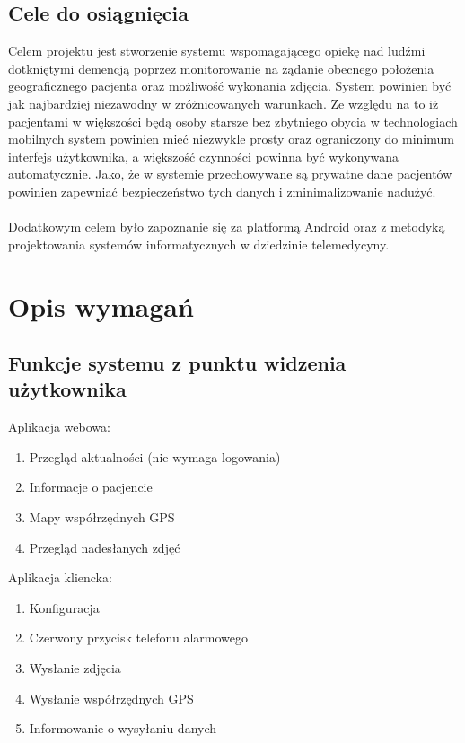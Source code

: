 \documentclass[11pt,a4paper]{article}
\begin{document}
\subsection {Cele do osiągnięcia}
Celem projektu jest stworzenie systemu wspomagającego opiekę nad ludźmi dotkniętymi demencją poprzez monitorowanie na żądanie obecnego położenia geograficznego pacjenta oraz możliwość wykonania zdjęcia. System powinien być jak najbardziej niezawodny w zróżnicowanych warunkach. Ze względu na to iż pacjentami w większości będą osoby starsze bez zbytniego obycia w technologiach mobilnych system powinien mieć niezwykle prosty oraz ograniczony do minimum interfejs użytkownika, a większość czynności powinna być wykonywana automatycznie. Jako, że w systemie przechowywane są prywatne dane pacjentów powinien zapewniać bezpieczeństwo tych danych i zminimalizowanie nadużyć.\\
\\
Dodatkowym celem było zapoznanie się za platformą Android oraz z metodyką projektowania systemów informatycznych w dziedzinie telemedycyny.
\section {Opis wymagań}
\subsection {Funkcje systemu z punktu widzenia użytkownika}
Aplikacja webowa:
\begin{enumerate}
  \item Przegląd aktualności (nie wymaga logowania)
  \item Informacje o pacjencie
  \item Mapy współrzędnych GPS
  \item Przegląd nadesłanych zdjęć
\end{enumerate}
Aplikacja kliencka:
\begin{enumerate}
\item Konfiguracja
\item Czerwony przycisk telefonu alarmowego
\item Wysłanie zdjęcia
\item Wysłanie współrzędnych GPS
\item Informowanie o wysyłaniu danych
\end{enumerate}
\newpage
\end{document}
